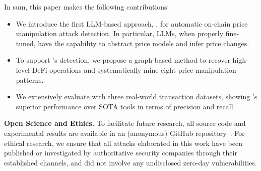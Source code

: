 In sum, this paper makes the following contributions:
\begin{itemize}[leftmargin=*,noitemsep,topsep=0pt]
\item We introduce the first LLM-based approach, \tool, for automatic on-chain price manipulation attack detection.
In particular, LLMs, when properly fine-tuned, have the capability to abstract price models and infer price changes. 

\item To support \tool's detection, we propose a graph-based method to recover high-level DeFi operations and systematically mine eight price manipulation patterns.

\item We extensively evaluate \tool with three real-world transaction datasets, showing \tool's superior performance over SOTA tools in terms of precision and recall. 
\end{itemize}


\noindent
\textbf{Open Science and Ethics.}
To facilitate future research, all source code and experimental results are available in an (anonymous) GitHub repository~\cite{anon_github_repo}.
For ethical research, we ensure that all attacks elaborated in this work have been published or investigated by authoritative security companies through their established channels, and did not involve any undisclosed zero-day vulnerabilities.

